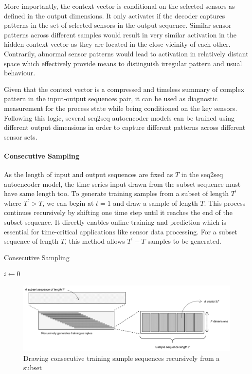 \documentclass[11pt]{article} %
\theoremstyle{plain}
\theoremstyle{definition}
\begin{document}
More importantly, the context vector is conditional on the selected sensors as defined in the output dimensions. It only activates if the decoder captures patterns in the set of selected sensors in the output sequence. Similar sensor patterns across different samples would result in very similar activation in the hidden context vector as they are located in the close vicinity of each other. Contrarily, abnormal sensor patterns would lead to activation in relatively distant space which effectively provide means to distinguish irregular pattern and usual behaviour.

Given that the context vector is a compressed and timeless summary of complex pattern in the input-output sequences pair, it can be used as diagnostic measurement for the process state while being conditioned on the key sensors. Following this logic, several seq2seq autoencoder models can be trained using different output dimensions in order to capture different patterns across different sensor sets.

\paragraph{Consecutive Sampling}

As the length of input and output sequences are fixed as \(T\) in the seq2seq autoencoder model, the time series input drawn from the subset sequence must have same length too. To generate training samples from a subset of length \(T^\prime\) where \(T^\prime > T\), we can begin at \(t=1\) and draw a sample of length \(T\). This process continues recursively by shifting one time step until it reaches the end of the subset sequence. It directly enables online training and prediction which is essential for time-critical applications like sensor data processing. For a subset sequence of length \(T\), this method allows \(T^\prime - T\) samples to be generated.


\begin{algorithm}[H]
	\label{consecutive_sampling}
	\caption{Consecutive Sampling}
	
	
	\(i\leftarrow 0\) \;
		\While{\(i \leqslant i+T \) }{
			Generate sample sequence \( (i, i+T  ] \) from the subset sequence\;
			\(i\leftarrow i+1\)\;
		}
\end{algorithm}


\begin{figure}[H]
	\centering
	\includegraphics[width=1\textwidth]{consecutive_sampling.PNG}
	\caption{Drawing consecutive training sample sequences recursively from a subset}
	\label{fig:consecutive_sampling}
\end{figure}
\end{document}
